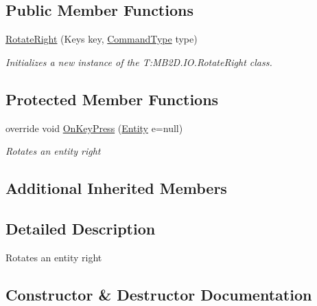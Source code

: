 \subsection*{Public Member Functions}
\begin{DoxyCompactItemize}
\item 
\hyperlink{class_m_b2_d_1_1_i_o_1_1_rotate_right_a63834f16dd32f6be7fe9408f177c26e1}{Rotate\+Right} (Keys key, \hyperlink{namespace_m_b2_d_1_1_i_o_ab5f95f3fe9e652778b62bdf943168a68}{Command\+Type} type)
\begin{DoxyCompactList}\small\item\em Initializes a new instance of the T\+:\+M\+B2\+D.\+I\+O.\+Rotate\+Right class. \end{DoxyCompactList}\end{DoxyCompactItemize}
\subsection*{Protected Member Functions}
\begin{DoxyCompactItemize}
\item 
override void \hyperlink{class_m_b2_d_1_1_i_o_1_1_rotate_right_a416106025812db523b009155d462cb6b}{On\+Key\+Press} (\hyperlink{class_m_b2_d_1_1_entity_component_1_1_entity}{Entity} e=null)
\begin{DoxyCompactList}\small\item\em Rotates an entity right \end{DoxyCompactList}\end{DoxyCompactItemize}
\subsection*{Additional Inherited Members}


\subsection{Detailed Description}
Rotates an entity right 



\subsection{Constructor \& Destructor Documentation}
\hypertarget{class_m_b2_d_1_1_i_o_1_1_rotate_right_a63834f16dd32f6be7fe9408f177c26e1}{}\label{class_m_b2_d_1_1_i_o_1_1_rotate_right_a63834f16dd32f6be7fe9408f177c26e1} 
